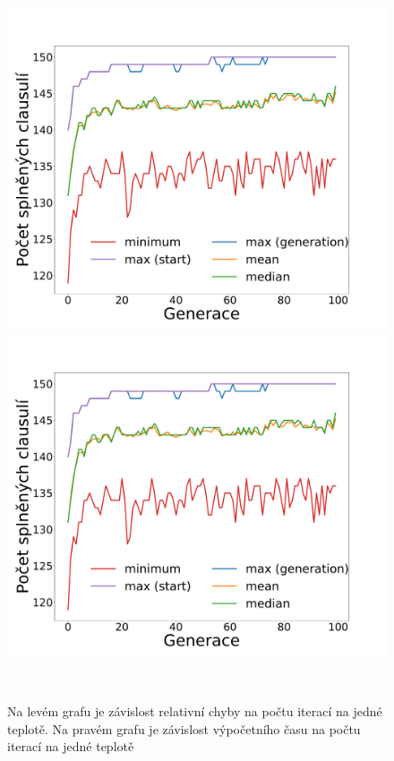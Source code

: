 \documentclass[11pt]{article}
\begin{document}
 


 \begin{figure}
	\centering
    \begin{minipage}[c]{0.42\textwidth}
        \centering\includegraphics[width=\textwidth]{img/1c.pdf} 
    \end{minipage}
    \begin{minipage}[c]{0.42\textwidth}
        \centering \includegraphics[width=\textwidth]{img/1c.pdf} 
    \end{minipage}
    \\
   \caption{Na levém grafu je závislost relativní chyby na počtu iterací na jedné teplotě. Na pravém grafu je závislost výpočetního času na počtu iterací na jedné teplotě}\label{fig:GZNC}
\end{figure} 
\end{document}
